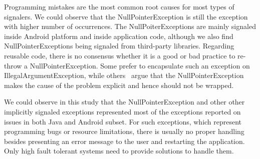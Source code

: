 \documentclass[conference]{IEEEtran}
\begin{document}
Programming mistakes are the most common root causes for most types of signalers. We
could observe that the NullPointerException is still the exception with higher
number of occurrences. The NullPoiterExceptions are mainly signaled inside
Android platform and inside application code, although we also find
NullPointerExceptions being signaled from third-party libraries. Regarding
reusable code, there is no consensus whether it is a good or bad practice to 
re-throw
a NullPointerException. Some prefer to encapsulate such an exception on
IllegalArgumentException, while others~\cite{bloch2008effective} argue that the
NullPointerException makes the cause of the problem explicit and hence 
should not be wrapped.

We could observe in this study that the NullPointerException and other
other implicitly signaled exceptions represented most of the exceptions reported
on issues in both Java and Android subset. For such exceptions, which represent
programming bugs or resource limitations, there is usually no proper handling
besides presenting an error message to the user and restarting the application.
Only high fault tolerant systems need to provide solutions to handle them.




\end{document}

